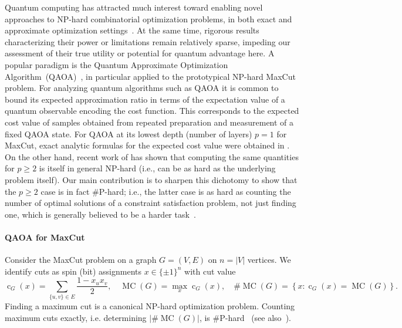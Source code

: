 \documentclass[11pt]{article}
\newcommand{\Cut}{\operatorname{c}}
\newcommand{\mc}{\operatorname{MC}}
\newcommand{\M}{\#\mc}
\newcommand{\set}[1]{\left\{#1\right\}}
\begin{document}
Quantum computing has %
attracted much interest toward enabling %
novel approaches to NP-hard combinatorial optimization problems, in both exact and approximate optimization settings~\cite{abbas2023quantum}. 
At the same time, rigorous results characterizing their power or limitations remain relatively sparse, %
impeding our assessment of their true 
utility or potential for quantum advantage here. %
A popular paradigm is the 
Quantum Approximate Optimization Algorithm~(QAOA)~\cite{Farhi2014,hadfield2019quantum}, in particular applied to the prototypical NP-hard MaxCut problem. 
For analyzing quantum algorithms such as QAOA it is common to bound its expected approximation ratio in terms of the expectation value of a quantum observable encoding the cost function. This corresponds to the expected cost value of samples obtained from repeated preparation and measurement of a fixed QAOA state. 
For QAOA at its lowest depth (number of layers) $p=1$ for MaxCut, exact analytic formulas for the expected cost value were obtained in \cite{Wang2018}. On the other hand, recent work of \cite{WangEtAl2025} has shown that computing the same quantities for $p\geq 2$ is 
itself in general NP-hard 
(i.e., can be as hard as the underlying problem itself). Our main contribution is to sharpen this dichotomy to show that the $p\geq 2$ case is in fact $\#$P-hard; i.e., the latter case is as hard as counting the number of optimal solutions of a constraint satisfaction problem, not just finding one, which is generally believed to be a harder %
task~\cite{Valiant1979,Krentel1988}. 




\paragraph{QAOA for MaxCut}
Consider the MaxCut problem on a graph $G=(V,E)$ on $n=|V|$ vertices.   
We identify cuts as spin (bit) assignments $x\in\{\pm1\}^{n}$ %
with cut value 
\begin{equation}
 \Cut_G(x)=\sum_{\{u,v\}\in E}\frac{1-x_ux_v}{2},
 \quad
 \mc(G)=\max_x\Cut_G(x),
 \quad
 \M(G)=\set{x:\Cut_G(x)=\mc(G)}.
 \label{eq:cut-definitions}
\end{equation} 
Finding a maximum cut %
is a canonical NP-hard optimization problem.  
Counting maximum cuts exactly, i.e. determining $|\M(G)|$, is $\#$P-hard~\cite[Lemma~13]{JerrumSinclair1993} (see also~\cite{provan1983complexity,hermann2009complexity}). 
\end{document}

